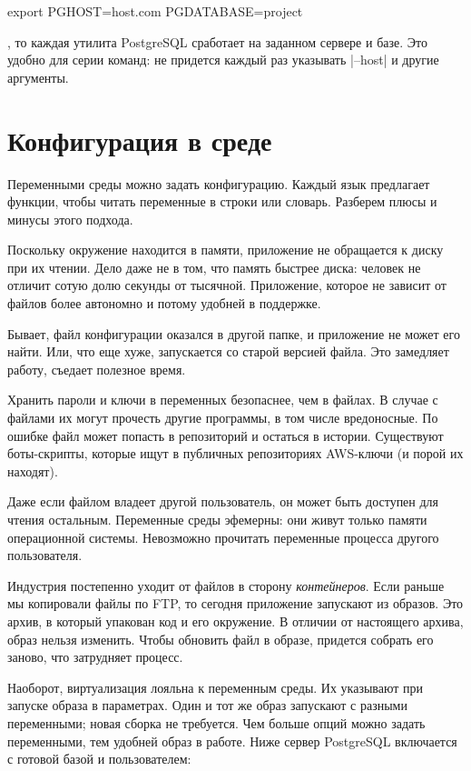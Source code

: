 \begin{english}
  \begin{bash}
export PGHOST=host.com PGDATABASE=project
  \end{bash}
\end{english}

\noindent
, то каждая утилита PostgreSQL сработает на заданном сервере и базе. Это удобно
для серии команд: не придется каждый раз указывать \spverb|--host| и другие
аргументы.

\section{Конфигурация в среде}

Переменными среды можно задать конфигурацию. Каждый язык предлагает функции,
чтобы читать переменные в строки или словарь. Разберем плюсы и минусы этого
подхода.

Поскольку окружение находится в памяти, приложение не обращается к диску при их
чтении. Дело даже не в том, что память быстрее диска: человек не отличит сотую
долю секунды от тысячной. Приложение, которое не зависит от файлов более
автономно и потому удобней в поддержке.

Бывает, файл конфигурации оказался в другой папке, и приложение не может его
найти. Или, что еще хуже, запускается со старой версией файла. Это замедляет
работу, съедает полезное время.

\label{password-note}

Хранить пароли и ключи в переменных безопаснее, чем в файлах. В случае с файлами
их могут прочесть другие программы, в том числе вредоносные. По ошибке файл
может попасть в репозиторий и остаться в истории. Существуют боты-скрипты,
которые ищут в публичных репозиториях AWS-ключи (и порой их находят).

Даже если файлом владеет другой пользователь, он может быть доступен для чтения
остальным. Переменные среды эфемерны: они живут только памяти операционной
системы. Невозможно прочитать переменные процесса другого пользователя.

Индустрия постепенно уходит от файлов в сторону \emph{контейнеров}. Если раньше
мы копировали файлы по FTP, то сегодня приложение запускают из образов. Это
архив, в который упакован код и его окружение. В отличии от настоящего архива,
образ нельзя изменить. Чтобы обновить файл в образе, придется собрать его
заново, что затрудняет процесс.

Наоборот, виртуализация лояльна к переменным среды. Их указывают при запуске
образа в параметрах. Один и тот же образ запускают с разными переменными; новая
сборка не требуется. Чем больше опций можно задать переменными, тем удобней
образ в работе. Ниже сервер PostgreSQL включается с готовой базой и
пользователем:

